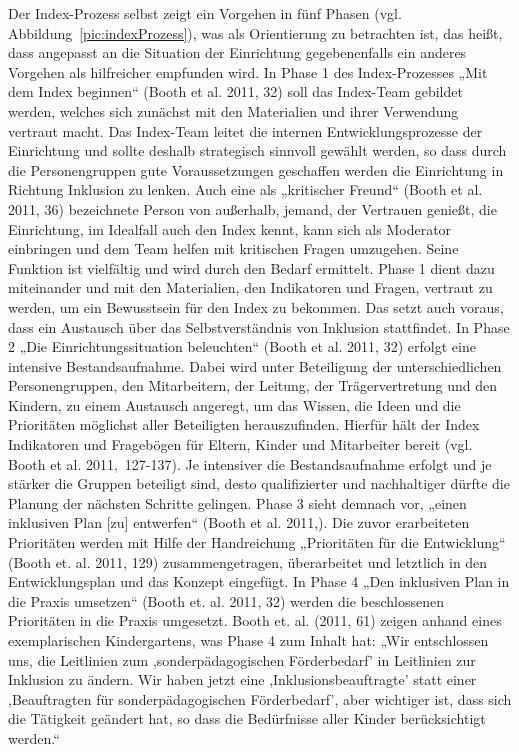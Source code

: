 Der Index-Prozess selbst zeigt ein Vorgehen in fünf Phasen (vgl. Abbildung~\ref{pic:indexProzess}), was als Orientierung zu betrachten ist, das heißt, dass angepasst an die Situation der Einrichtung gegebenenfalls ein anderes Vorgehen als hilfreicher empfunden wird.  
In Phase 1 des Index-Prozesses „Mit dem Index beginnen“ (Booth et al. 2011, 32) soll das Index-Team gebildet werden, welches sich zunächst mit den Materialien und ihrer Verwendung vertraut macht. Das Index-Team leitet die internen Entwicklungsprozesse der Einrichtung und sollte deshalb strategisch sinnvoll gewählt werden, so dass durch die Personengruppen gute Voraussetzungen geschaffen werden die Einrichtung in Richtung Inklusion zu lenken. Auch eine als „kritischer Freund“ (Booth et al. 2011, 36) bezeichnete Person von außerhalb, jemand, der Vertrauen genießt, die Einrichtung, im Idealfall auch den Index kennt, kann sich als Moderator einbringen und dem Team helfen mit kritischen Fragen umzugehen. Seine Funktion ist vielfältig und wird durch den Bedarf ermittelt. Phase 1 dient dazu miteinander und mit den Materialien, den Indikatoren und Fragen, vertraut zu werden, um ein Bewusstsein für den Index zu bekommen. Das setzt auch voraus, dass ein Austausch über das Selbstverständnis von Inklusion stattfindet.  
In Phase 2 „Die Einrichtungssituation beleuchten“ (Booth et al. 2011, 32) erfolgt eine intensive Bestandsaufnahme. Dabei wird unter Beteiligung der  unterschiedlichen Personengruppen, den Mitarbeitern, der Leitung, der Trägervertretung und den Kindern, zu einem Austausch angeregt, um das Wissen, die Ideen und die Prioritäten möglichst aller Beteiligten herauszufinden. Hierfür hält der Index Indikatoren und Fragebögen für Eltern, Kinder und Mitarbeiter bereit (vgl. Booth et al. 2011,~127-137). Je intensiver die Bestandsaufnahme erfolgt und je stärker die Gruppen beteiligt sind, desto qualifizierter und nachhaltiger dürfte die Planung der nächsten Schritte gelingen. 
Phase 3 sieht demnach vor, „einen inklusiven Plan [zu] entwerfen“ (Booth et al. 2011,). Die zuvor erarbeiteten Prioritäten werden mit Hilfe der Handreichung „Prioritäten für die Entwicklung“ (Booth et. al. 2011, 129) zusammengetragen, überarbeitet und letztlich in den Entwicklungsplan und das Konzept eingefügt.
In Phase 4 „Den inklusiven Plan in die Praxis umsetzen“ (Booth et. al. 2011, 32) werden die beschlossenen Prioritäten in die Praxis umgesetzt.  
Booth et. al. (2011, 61) zeigen anhand eines exemplarischen Kindergartens, was Phase 4 zum Inhalt hat: „Wir entschlossen uns, die Leitlinien zum ,sonderpädagogischen Förderbedarf' in Leitlinien zur Inklusion zu ändern. Wir haben jetzt eine ,Inklusionsbeauftragte' statt einer ,Beauftragten für sonderpädagogischen Förderbedarf', aber wichtiger ist, dass sich die Tätigkeit geändert hat, so dass die Bedürfnisse aller Kinder berücksichtigt werden.“   
